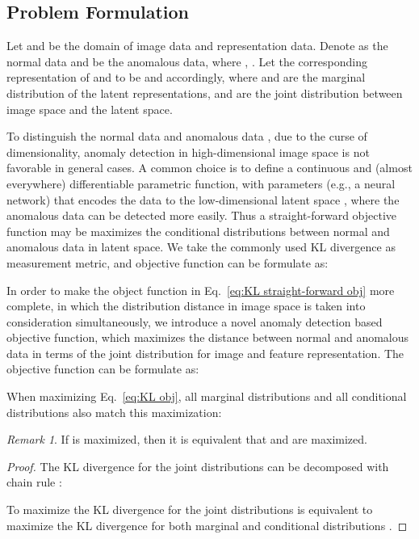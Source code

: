 \documentclass[journal]{IEEEtran}
\theoremstyle{remark}
\newtheorem{remark}{Remark}
\begin{document}
\subsection{Problem Formulation} 

Let  and  be the domain of image data and representation data. Denote  as the normal data and  be the anomalous data, where , . Let the corresponding representation of  and  to be  and  accordingly, where  and  are the marginal distribution of the latent representations,  and  are the joint distribution between image space and the latent space. 

To distinguish the normal data  and anomalous data , due to the curse of dimensionality, anomaly detection in high-dimensional image space is not favorable in general cases. 
A common choice is to define a continuous and (almost everywhere) differentiable parametric function,  with parameters  (e.g., a neural network) that encodes the data to the low-dimensional latent space , where the anomalous data can be detected more easily. 
Thus a straight-forward objective function may be maximizes the conditional distributions between normal and anomalous data in latent space. We take the commonly used KL divergence as measurement metric, and objective function can be formulate as:


In order to make the object function in Eq.~\ref{eq:KL straight-forward obj} more complete, in which the distribution distance in image space is taken into consideration simultaneously, we introduce a novel anomaly detection based objective function, which maximizes the distance between normal and anomalous data in terms of the joint distribution for image and feature representation. The objective function can be formulate as:


When maximizing Eq.~\ref{eq:KL obj}, all marginal distributions and all conditional distributions also match this maximization:

\begin{remark}\label{rmk:eq}
If  is maximized, then it is equivalent that  and  are maximized.
\end{remark}

\begin{proof}
The KL divergence for the joint distributions can be decomposed with chain rule \cite{cover2006elements}:

To maximize the KL divergence for the joint distributions is equivalent to maximize the KL divergence for both marginal and conditional distributions \cite{dumoulin2016adversarially}.
\end{proof}
\end{document}
